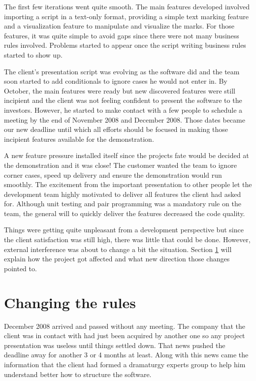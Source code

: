 \documentclass[lnbip]{svmultln}
\begin{document}
The first few iterations went quite smooth. The main features developed involved importing a script in a text-only format, providing a simple text marking feature and a visualization feature to manipulate and visualize the marks. For those features, it was quite simple to avoid gaps since there were not many business rules involved. Problems started to appear once the script writing business rules started to show up.

The client's presentation script was evolving as the software did and the team soon started to add conditionals to ignore cases he would not enter in. By October, the main features were ready but new discovered features were still incipient and the client was not feeling confident to present the software to the investors. However, he started to make contact with a few people to schedule a meeting by the end of November 2008 and December 2008. Those dates became our new deadline until which all efforts should be focused in making those incipient features available for the demonstration.

A new feature pressure installed itself since the projects fate would be decided at the demonstration and it was close! The customer wanted the team to ignore corner cases, speed up delivery and ensure the demonstration would run smoothly. The excitement from the important presentation to other people let the development team highly motivated to deliver all features the client had asked for. Although unit testing and pair programming was a mandatory rule on the team, the general will to quickly deliver the features decreased the code quality.

Things were getting quite unpleasant from a development perspective but since the client satisfaction was still high, there was little that could be done. However, external interference was about to change a bit the situation. Section \ref{sec:changes} will explain how the project got affected and what new direction those changes pointed to.

\section{Changing the rules}
\label{sec:changes}

December 2008 arrived and passed without any meeting. The company that
the client was in contact with had just been acquired by another one
so any project presentation was useless until things settled
down. That news pushed the deadline away for another 3 or 4 months at
least. Along with this news came the information that the client had
formed a dramaturgy experts group to help him understand better how to
structure the software.
\end{document}
